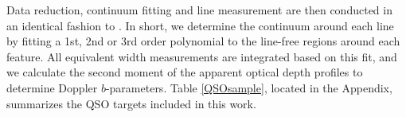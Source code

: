 
Data reduction, continuum fitting and line measurement are then conducted in an identical fashion to \cite{french2017}. In short, we determine the continuum around each line by fitting a 1st, 2nd or 3rd order polynomial to the line-free regions around each feature. All equivalent width measurements are integrated based on this fit, and we calculate the second moment of the apparent optical depth profiles to determine Doppler $b$-parameters. Table \ref{QSOsample}, located in the Appendix, summarizes the QSO targets included in this work.

